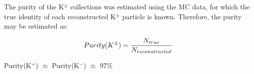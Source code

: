 \documentclass[../AnalysisNoteJBuxton.tex]{subfiles}
\begin{document}
The purity of the K$^{\pm}$ collections was estimated using the MC data, for which the true identity of each reconstructed K$^{\pm}$ particle is known.  Therefore, the purity may be estimated as:

\begin{equation}
 Purity(K^{\pm}) = \frac{N_{true}}{N_{reconstructed}} \\
\label{eqn:KchPurity}
\end{equation}

Purity(K$^{+}$) $\approx$ Purity(K$^{-}$) $\approx$ 97\%
\end{document}
